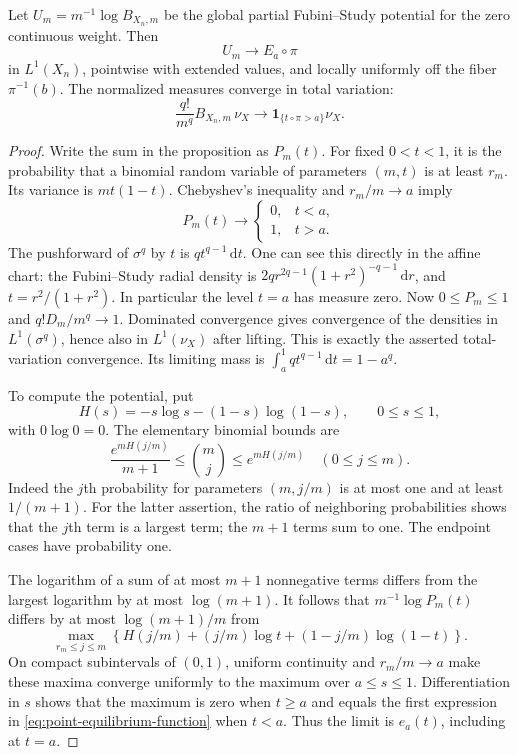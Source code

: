 \begin{theorem}\label{thm:hopf-point-potential-limit}
Let $U_m=m^{-1}\log B_{X_n,m}$ be the global partial Fubini--Study potential for the zero continuous weight. Then
\[
 U_m\longrightarrow E_a\circ\pi
\]
in $L^1(X_n)$, pointwise with extended values, and locally uniformly off the fiber $\pi^{-1}(b)$. The normalized measures converge in total variation:
\[
 \frac{q!}{m^q}B_{X_n,m}\,\nu_X
       \longrightarrow
       \mathbf1_{\{t\circ\pi>a\}}\nu_X.
\]
\end{theorem}
\begin{proof}
Write the sum in the proposition as $P_m(t)$. For fixed $0<t<1$, it is the probability that a binomial random variable of parameters $(m,t)$ is at least $r_m$. Its variance is $mt(1-t)$. Chebyshev's inequality and $r_m/m\to a$ imply
\[
 P_m(t)\longrightarrow
 \begin{cases}0,&t<a,\\1,&t>a.\end{cases}
\]
The pushforward of $\sigma^q$ by $t$ is $q t^{q-1}\,\mathrm{d}t$. One can see this directly in the affine chart: the Fubini--Study radial density is
$2q r^{2q-1}(1+r^2)^{-q-1}\,\mathrm{d}r$, and $t=r^2/(1+r^2)$. In particular the level $t=a$ has measure zero. Now $0\leq P_m\leq1$ and $q!D_m/m^q\to1$. Dominated convergence gives convergence of the densities in $L^1(\sigma^q)$, hence also in $L^1(\nu_X)$ after lifting. This is exactly the asserted total-variation convergence. Its limiting mass is $\int_a^1 qt^{q-1}\,\mathrm{d}t=1-a^q$.

To compute the potential, put
\[
 H(s)=-s\log s-(1-s)\log(1-s),\qquad 0\leq s\leq1,
\]
with $0\log0=0$. The elementary binomial bounds are
\[
 \frac{e^{mH(j/m)}}{m+1}\leq\binom mj
                   \leq e^{mH(j/m)}\quad(0\leq j\leq m).
\]
Indeed the $j$th probability for parameters $(m,j/m)$ is at most one and at least $1/(m+1)$. For the latter assertion, the ratio of neighboring probabilities shows that the $j$th term is a largest term; the $m+1$ terms sum to one. The endpoint cases have probability one.

The logarithm of a sum of at most $m+1$ nonnegative terms differs from the largest logarithm by at most $\log(m+1)$. It follows that $m^{-1}\log P_m(t)$ differs by at most $\log(m+1)/m$ from
\[
 \max_{r_m\leq j\leq m}
 \left\{H(j/m)+(j/m)\log t+(1-j/m)\log(1-t)\right\}.
\]
On compact subintervals of $(0,1)$, uniform continuity and $r_m/m\to a$ make these maxima converge uniformly to the maximum over $a\leq s\leq1$. Differentiation in $s$ shows that the maximum is zero when $t\geq a$ and equals the first expression in \eqref{eq:point-equilibrium-function} when $t<a$. Thus the limit is $e_a(t)$, including at $t=a$.


\end{proof}
